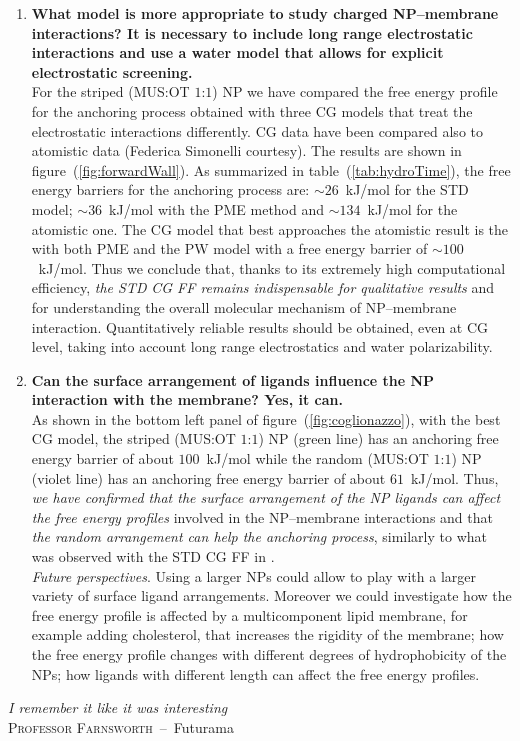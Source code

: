 \begin{enumerate}[label=\itshape\roman*.,listparindent=1em]
 	\item \textbf{\textsf{What model is more appropriate to study charged \ac{NP}--membrane interactions? It is necessary to include long range electrostatic interactions and use a water model that allows for explicit electrostatic screening.}}\\For the striped (\acs{MUS}:\acs{OT} $1$:$1$) \ac{NP} we have compared the free energy profile for the anchoring process obtained with three \ac{CG} models that treat the electrostatic interactions differently. \ac{CG} data have been compared also to atomistic data (Federica Simonelli courtesy). The results are shown in figure~(\ref{fig:forwardWall}). As summarized in table~(\ref{tab:hydroTime}), the free energy barriers for the anchoring process are: $\sim26$~kJ/mol for the \ac{STD} \martini{} model; $\sim36$~kJ/mol with the \ac{PME} method and $\sim134$~kJ/mol for the atomistic one. The \ac{CG} model that best approaches the atomistic result is the \martini{} with both \ac{PME} and the \ac{PW} model with a free energy barrier of $\sim100$~kJ/mol. Thus we conclude that, thanks to its extremely high computational efficiency, \textit{the \ac{STD}} \martini{} \textit{\ac{CG} \ac{FF} remains indispensable for qualitative results} and for understanding the overall molecular mechanism of \ac{NP}--membrane interaction. Quantitatively reliable results should be obtained, even at \ac{CG} level, taking into account long range electrostatics and water polarizability.%

	\item \textbf{\textsf{Can the surface arrangement of ligands influence the \ac{NP} interaction with the membrane? Yes, it can.}}\\As shown in the bottom left panel of figure~(\ref{fig:coglionazzo}), with the best \ac{CG} model, the striped (\acs{MUS}:\acs{OT} $1$:$1$) \ac{NP} (green line) has an anchoring free energy barrier of about $100$~kJ/mol while the random (\acs{MUS}:\acs{OT} $1$:$1$) \ac{NP} (violet line) has an anchoring free energy barrier of about $61$~kJ/mol. Thus, \textit{we have confirmed that the surface arrangement of the \ac{NP} ligands can affect the free energy profiles} involved in the \ac{NP}--membrane interactions and that \textit{the random arrangement can help the anchoring process}, similarly to what was observed with the \ac{STD} \martini{} \ac{CG} \ac{FF} in \cite{ourPaper}.\\\indent\textit{Future perspectives}. Using a larger \acp{NP} could allow to play with a larger variety of surface ligand arrangements. Moreover we could investigate how the free energy profile is affected by a multicomponent lipid membrane, for example adding cholesterol, that increases the rigidity of the membrane; how the free energy profile changes with different degrees of hydrophobicity of the \acp{NP}; how ligands with different length can affect the free energy profiles.%
\end{enumerate}

\vfill
\begin{flushright}
	\textsl{I remember it like it was interesting}\\\smallskip
	\footnotesize\textsc{\sffamily Professor Farnsworth}\ --\ \textsf{Futurama}
\end{flushright}
